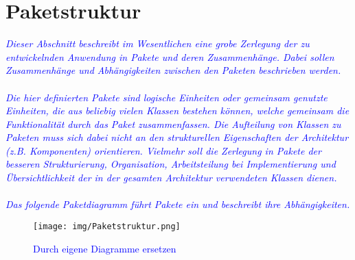 \section{Paketstruktur}
\textcolor{blue}{\textit{Dieser Abschnitt beschreibt im Wesentlichen eine grobe Zerlegung der zu entwickelnden Anwendung in Pakete und deren Zusammenhänge. Dabei sollen Zusammenhänge und Abhängigkeiten zwischen den Paketen beschrieben werden.\\\\
Die hier definierten Pakete sind logische Einheiten oder gemeinsam genutzte Einheiten, die aus beliebig vielen Klassen bestehen können, welche gemeinsam die Funktionalität durch das Paket zusammenfassen. Die Aufteilung von Klassen zu Paketen muss sich dabei nicht an den strukturellen Eigenschaften der Architektur (z.B. Komponenten) orientieren. Vielmehr soll die Zerlegung in Pakete der besseren Strukturierung, Organisation, Arbeitsteilung bei Implementierung und Übersichtlichkeit der in der gesamten Architektur verwendeten Klassen dienen.\\\\
Das folgende Paketdiagramm führt Pakete ein und beschreibt ihre Abhängigkeiten. 
}}

\begin{figure}[H]
\centering
\texttt{[image: img/Paketstruktur.png]}
\caption{\textcolor{blue}{Durch eigene Diagramme ersetzen}}
\label{Paketstruktur}
\end{figure}
